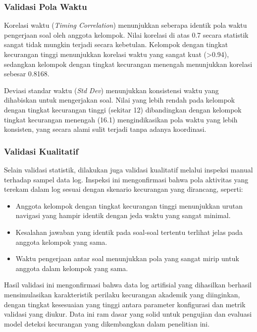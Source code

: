 \subsubsection{Validasi Pola Waktu}
Korelasi waktu (\textit{Timing Correlation}) menunjukkan seberapa identik pola waktu pengerjaan soal oleh anggota kelompok. Nilai korelasi di atas 0.7 secara statistik sangat tidak mungkin terjadi secara kebetulan. Kelompok dengan tingkat kecurangan tinggi menunjukkan korelasi waktu yang sangat kuat (>0.94), sedangkan kelompok dengan tingkat kecurangan menengah menunjukkan korelasi sebesar 0.8168.

Deviasi standar waktu (\textit{Std Dev}) menunjukkan konsistensi waktu yang dihabiskan untuk mengerjakan soal. Nilai yang lebih rendah pada kelompok dengan tingkat kecurangan tinggi (sekitar 12) dibandingkan dengan kelompok tingkat kecurangan menengah (16.1) mengindikasikan pola waktu yang lebih konsisten, yang secara alami sulit terjadi tanpa adanya koordinasi.

\subsubsection{Validasi Kualitatif}
Selain validasi statistik, dilakukan juga validasi kualitatif melalui inspeksi manual terhadap sampel data log. Inspeksi ini mengonfirmasi bahwa pola aktivitas yang terekam dalam log sesuai dengan skenario kecurangan yang dirancang, seperti:

\begin{itemize}
    \item Anggota kelompok dengan tingkat kecurangan tinggi menunjukkan urutan navigasi yang hampir identik dengan jeda waktu yang sangat minimal.
    \item Kesalahan jawaban yang identik pada soal-soal tertentu terlihat jelas pada anggota kelompok yang sama.
    \item Waktu pengerjaan antar soal menunjukkan pola yang sangat mirip untuk anggota dalam kelompok yang sama.
\end{itemize}

Hasil validasi ini mengonfirmasi bahwa data log artifisial yang dihasilkan berhasil mensimulasikan karakteristik perilaku kecurangan akademik yang diinginkan, dengan tingkat kesesuaian yang tinggi antara parameter konfigurasi dan metrik validasi yang diukur. Data ini ram dasar yang solid untuk pengujian dan evaluasi model deteksi kecurangan yang dikembangkan dalam penelitian ini.

